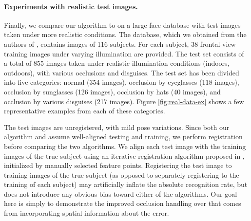 \paragraph{Experiments with realistic test images.} Finally, we compare our algorithm to \cite{Wright2009-PAMI} on a large face database with test images taken under more realistic conditions. The database, which we obtained from the authors of \cite{Wagner2009-CVPR}, contains images of 116 subjects. For each subject, 38 frontal-view training images under varying illumination are provided. The test set consists of a total of 855 images taken under realistic illumination conditions (indoors, outdoors), with various occlusions and disguises. The test set has been divided into five categories: normal (354 images), occlusion by eyeglasses (118 images), occlusion by sunglasses (126 images), occlusion by hats (40 images), and occlusion by various disguises (217 images). Figure \ref{fig:real-data-ex} shows a few representative examples from each of these categories.

The test images are unregistered, with mild pose variations. Since both our algorithm and \cite{Wright2009-PAMI}
assume well-aligned testing and training, we perform registration before comparing the two algorithms. We align each
test image with the training images of the true subject using an iterative registration algorithm proposed in
\cite{Wagner2009-CVPR}, initialized by manually selected feature points. Registering the test image to training images of the true subject (as opposed to separately registering to the training of each subject) may artificially inflate the absolute recognition rate, but does not introduce any obvious bias toward either of the algorithms. Our goal here is simply to demonstrate the improved occlusion handling over \cite{Wright2009-PAMI} that comes from incorporating spatial information about the error.

